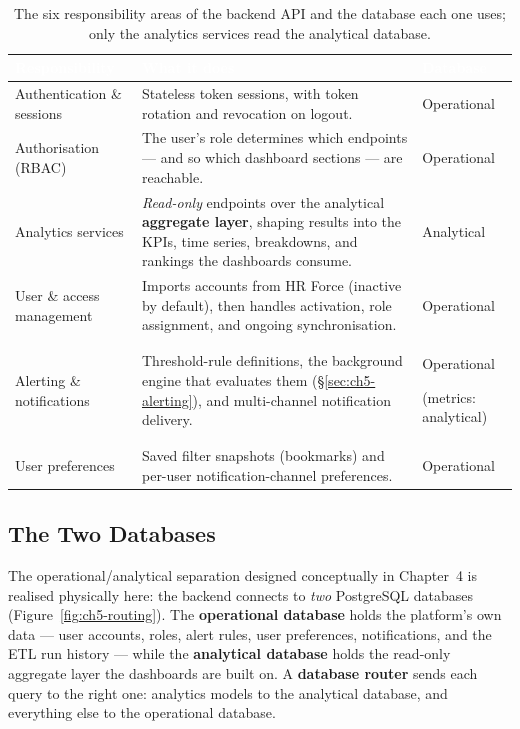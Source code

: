 \begin{table}[H]
\centering
\caption{The six responsibility areas of the backend API and the database each one uses; only the
analytics services read the analytical database.}
\label{tab:ch5-backend-resp}
\renewcommand{\arraystretch}{1.35}
\begin{tabularx}{\linewidth}{|>{\raggedright\arraybackslash}p{3.4cm}|>{\raggedright\arraybackslash}X|>{\raggedright\arraybackslash}p{2.5cm}|}
\hline
\rowcolor{tblheader}
\textcolor{white}{\textbf{Responsibility}} & \textcolor{white}{\textbf{What it does}} &
\textcolor{white}{\textbf{Database}} \\
\hline
Authentication \& sessions & Stateless token sessions, with token rotation and revocation on logout. &
Operational \\
Authorisation (RBAC) & The user's role determines which endpoints --- and so which dashboard sections
--- are reachable. & Operational \\
Analytics services & \emph{Read-only} endpoints over the analytical \textbf{aggregate layer}, shaping
results into the KPIs, time series, breakdowns, and rankings the dashboards consume. & Analytical \\
User \& access management & Imports accounts from HR Force (inactive by default), then handles
activation, role assignment, and ongoing synchronisation. & Operational \\
Alerting \& notifications & Threshold-rule definitions, the background engine that evaluates them
(\S\ref{sec:ch5-alerting}), and multi-channel notification delivery. & Operational \par(metrics:
analytical) \\
User preferences & Saved filter snapshots (bookmarks) and per-user notification-channel preferences. &
Operational \\
\hline
\end{tabularx}
\end{table}

\subsection{The Two Databases}

The operational/analytical separation designed conceptually in Chapter~4 is realised physically here:
the backend connects to \emph{two} PostgreSQL databases (Figure~\ref{fig:ch5-routing}). The
\textbf{operational database} holds the platform's own data --- user accounts, roles, alert rules, user
preferences, notifications, and the ETL run history --- while the \textbf{analytical database} holds the
read-only aggregate layer the dashboards are built on. A \textbf{database router} sends each query to the
right one: analytics models to the analytical database, and everything else to the operational database.

